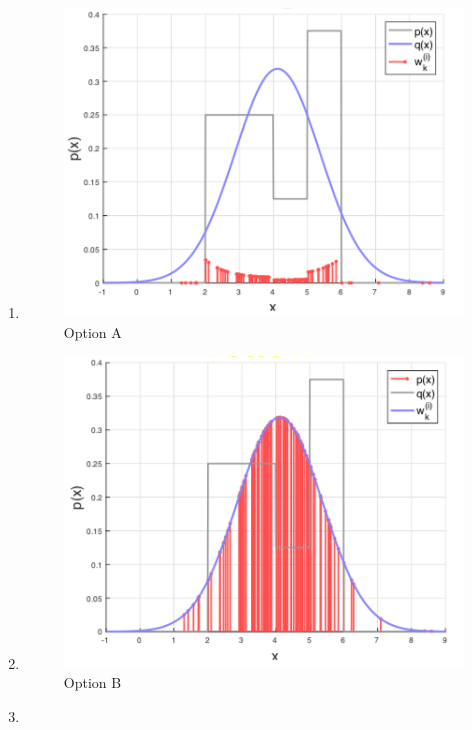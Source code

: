 \begin{enumerate}
\begin{enumerate}
\item \begin{figure}[!htb]
\begin{center}
\includegraphics[scale=0.320]{img/particle_filters/P7a_importancesampling.png}
\end{center}
\caption{Option A}
\label{P7a_importancesampling}
\end{figure}
\item \begin{figure}[!htb]
\begin{center}
\includegraphics[scale=0.320]{img/particle_filters/P7b_importancesampling.png}
\end{center}
\caption{Option B}
\label{P7b_importancesampling}
\end{figure}
\item \begin{figure}[!htb]

\end{figure}
\end{enumerate}
\end{enumerate}
